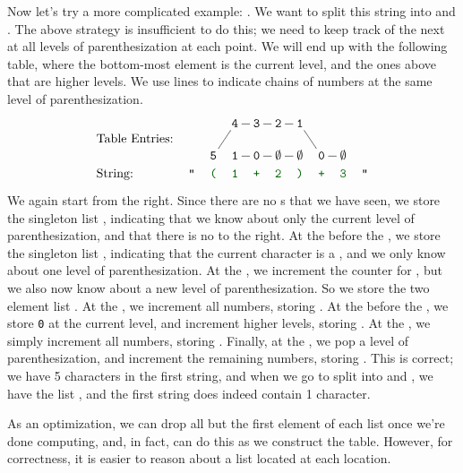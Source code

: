     Now let's try a more complicated example: .  We want to split this string into  and .  The above strategy is insufficient to do this; we need to keep track of the next \terminal{+} at all levels of parenthesization at each point.  We will end up with the following table, where the bottom-most element is the current level, and the ones above that are higher levels.  We use lines to indicate chains of numbers at the same level of parenthesization.    
    \[
    \xymatrix@C=0.5pc@R=0pc{
    &&&\texttt{4}\ar@{-}[r] &\texttt{3}\ar@{-}[r] &\texttt{2}\ar@{-}[r] &\texttt{1}\ar@{-}[ddr]\\
    \text{Table Entries:} \\
    &&\texttt{5}\ar@{-}[uur]&\texttt{1}\ar@{-}[r] &\texttt{0}\ar@{-}[r] &\nullentry\ar@{-}[r] &\nullentry&\texttt{0}\ar@{-}[r] &\nullentry\\
    \aswidthof{\text{String:}}{\text{Table Entries:}} & \stropen & \strcolored{(} & \strcolored{1} & \strcolored{+} & \strcolored{2} & \strcolored{)} & \strcolored{+} & \strcolored{3} & \strclose
    }
    \]    
    We again start from the right.  Since there are no \terminal{+}s that we have seen, we store the singleton list , indicating that we know about only the current level of parenthesization, and that there is no \terminal{+} to the right.  At the \terminal{+} before the , we store the singleton list , indicating that the current character is a \terminal{+}, and we only know about one level of parenthesization.  At the \terminal{)}, we increment the counter for \terminal{+}, but we also now know about a new level of parenthesization.  So we store the two element list .  At the , we increment all numbers, storing .  At the \terminal{+} before the , we store \texttt{0} at the current level, and increment higher levels, storing .  At the , we simply increment all numbers, storing .  Finally, at the \terminal{(}, we pop a level of parenthesization, and increment the remaining numbers, storing .  This is correct; we have 5 characters in the first string, and when we go to split  into  and , we have the list , and the first string does indeed contain 1 character.
    
    As an optimization, we can drop all but the first element of each list once we're done computing, and, in fact, can do this as we construct the table.  However, for correctness, it is easier to reason about a list located at each location.
    
